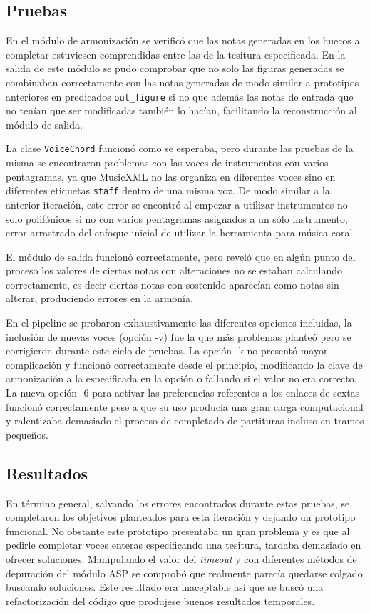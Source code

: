 \subsection{Pruebas}
\label{subsec:seventh_iteration_tests}
En el módulo de armonización se verificó que las notas generadas en los huecos a completar estuviesen comprendidas entre las de la tesitura especificada. En la salida de este módulo se pudo comprobar que no solo las figuras generadas se combinaban correctamente con las notas generadas de modo similar a prototipos anteriores en predicados \texttt{out\_figure} si no que además las notas de entrada que no tenían que ser modificadas también lo hacían, facilitando la reconstrucción al módulo de salida.

La clase \texttt{VoiceChord} funcionó como se esperaba, pero durante las pruebas de la misma se encontraron problemas con las voces de instrumentos con varios pentagramas, ya que MusicXML no las organiza en diferentes voces sino en diferentes etiquetas \texttt{staff} dentro de una misma voz. De modo similar a la anterior iteración, este error se encontró al empezar a utilizar instrumentos no solo polifónicos si no con varios pentagramas asignados a un sólo instrumento, error arrastrado del enfoque inicial de utilizar la herramienta para música coral.

El módulo de salida funcionó correctamente, pero reveló que en algún punto del proceso los valores de ciertas notas con alteraciones no se estaban calculando correctamente, es decir ciertas notas con sostenido aparecían como notas sin alterar, produciendo errores en la armonía.

En el pipeline se probaron exhaustivamente las diferentes opciones incluidas, la inclusión de nuevas voces (opción -v) fue la que más problemas planteó pero se corrigieron durante este ciclo de pruebas. La opción -k no presentó mayor complicación y funcionó correctamente desde el principio, modificando la clave de armonización a la especificada en la opción o fallando si el valor no era correcto. La nueva opción -6 para activar las preferencias referentes a los enlaces de sextas funcionó correctamente pese a que su uso producía una gran carga computacional y ralentizaba demasiado el proceso de completado de partituras incluso en tramos pequeños.

\subsection{Resultados}
\label{subsec:seventh_iteration_results}
En término general, salvando los errores encontrados durante estas pruebas, se completaron los objetivos planteados para esta iteración y dejando un prototipo funcional. No obstante este prototipo presentaba un gran problema y es que al pedirle completar voces enteras especificando una tesitura, tardaba demasiado en ofrecer soluciones. Manipulando el valor del \textit{timeout} y con diferentes métodos de depuración del módulo ASP se comprobó que realmente parecía quedarse colgado buscando soluciones. Este resultado era inaceptable así que se buscó una refactorización del código que produjese buenos resultados temporales.

